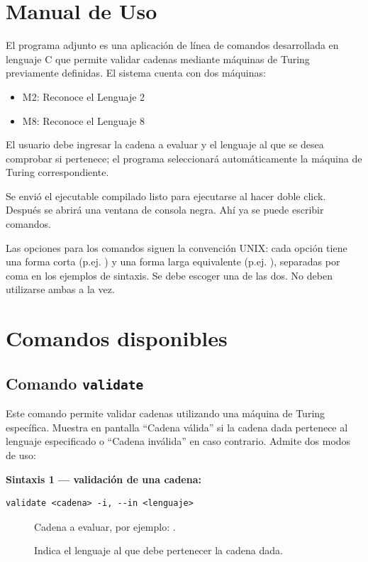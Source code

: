 \documentclass[../main.tex]{subfiles}
\begin{document}
    \section{Manual de Uso}
    El programa adjunto es una aplicación de línea de comandos desarrollada en
    lenguaje C que permite validar cadenas mediante máquinas de Turing
    previamente definidas. El sistema cuenta con dos máquinas:

    \begin{itemize}
        \item M2: Reconoce el Lenguaje 2
        \item M8: Reconoce el Lenguaje 8
    \end{itemize}

    El usuario debe ingresar la cadena a evaluar y el lenguaje al que se desea
    comprobar si pertenece; el programa seleccionará automáticamente la máquina de
    Turing correspondiente.

    Se envió el ejecutable compilado listo para ejecutarse al hacer doble click.
    Después se abrirá una ventana de consola negra. Ahí ya se puede escribir
    comandos.

    Las opciones para los comandos siguen la convención UNIX: cada opción tiene
    una forma corta (p.ej. ) y una forma larga equivalente (p.ej.
    ), separadas por coma en los ejemplos de sintaxis. Se debe
    escoger una de las dos. No deben utilizarse ambas a la vez.

    \section{Comandos disponibles}

    \subsection{Comando \texttt{validate}}
    Este comando permite validar cadenas utilizando una máquina de Turing
    específica. Muestra en pantalla ``Cadena válida'' si la cadena dada pertenece al lenguaje especificado o ``Cadena inválida'' en caso contrario. Admite dos modos de uso:

    \textbf{Sintaxis 1 — validación de una cadena:}

    \begin{lstlisting}[style=console]
    validate <cadena> -i, --in <lenguaje>
    \end{lstlisting}

    \begin{description}
        \item[] Cadena a evaluar, por ejemplo: .
        \item[] Indica el lenguaje al que debe pertenecer la cadena dada.
    \end{description}
\end{document}
